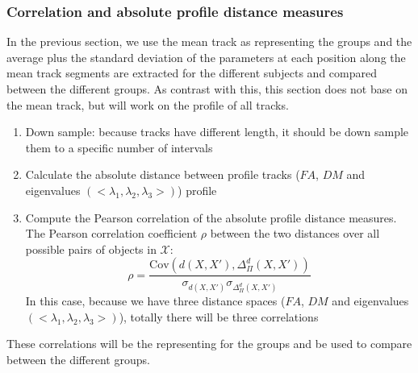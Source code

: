 \subsubsection{Correlation and absolute profile distance measures}
\label{subsec:experiments_quantification_correlation}
In the previous section, we use the mean track as representing the groups and the average plus the standard deviation
of the parameters at each position along the mean track segments are extracted for the different subjects
and compared between the different groups. As contrast with this, this section does not base on the mean track, but will work on the profile of all tracks.
\begin{enumerate}
	\item Down sample: because tracks have different length, it should be down sample them to a specific number of intervals
	\item Calculate the absolute distance between profile tracks ($FA$, $DM$ and eigenvalues $(<\lambda_{1},\lambda_{2},\lambda_{3}>)$)  profile
	\item Compute the Pearson correlation of the absolute profile distance measures. The Pearson correlation
coefficient $\rho$ between the two distances over all possible pairs of objects in $\mathcal{X}$:
\begin{equation}
\label{eq:accuracy_correlation}
	\rho = \frac{\mathrm{Cov}(d(X,X'),\Delta_{\Pi}^d(X,X'))}{\sigma_{d(X,X')}\sigma_{\Delta_{\Pi}^d(X,X')}}
\end{equation}
In this case, because we have three distance spaces ($FA$, $DM$ and eigenvalues $(<\lambda_{1},\lambda_{2},\lambda_{3}>)$),  totally there will be three correlations
\end{enumerate}

These correlations will be the representing for the groups and be used to compare between the different groups.

